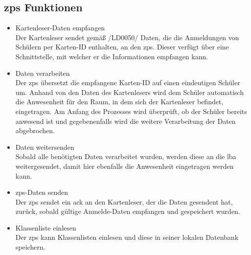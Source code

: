 \subsection{\gls{zps} Funktionen}
\begin{itemize}[leftmargin=1.0in]
        
    
    \item[\lf] Kartenleser-Daten empfangen\\
        Der Kartenleser sendet gemäß /LD0050/ Daten, die die Anmeldungen von Schülern per Karten-ID enthalten, an den \gls{zps}. Dieser verfügt über eine Schnittstelle, mit welcher er die Informationen empfangen kann. %
    
    \item[\lf] Daten verarbeiten\\
        Der \gls{zps} übersetzt die empfangene Karten-ID auf einen eindeutigen Schüler um. Anhand von den Daten des Kartenlesers wird dem Schüler automatisch die Anwesenheit für den Raum, in dem sich der Kartenleser befindet, eingetragen. Am Anfang des Prozesses wird überprüft, ob der Schüler bereits anwesend ist und gegebenenfalls wird die weitere Verarbeitung der Daten abgebrochen.
    \newpage
    
    \item[\lf] Daten weitersenden\\
        Sobald alle benötigten Daten verarbeitet wurden, werden diese an die \gls{lba} weitergesendet, damit hier ebenfalls die Anwesenheit eingetragen werden kann.
        
    \item[\lf] \gls{zps}-Daten senden \\ %
        Der \gls{zps} sendet ein \gls{ack} an den Kartenleser, der die Daten gesendent hat, zurück, sobald gültige Anmelde-Daten empfangen und gespeichert wurden.
        
    \item[\lf] Klassenliste einlesen\\
        Der \gls{zps} kann Klassenlisten einlesen und diese in seiner lokalen Datenbank speichern.
\end{itemize}
\lfn
